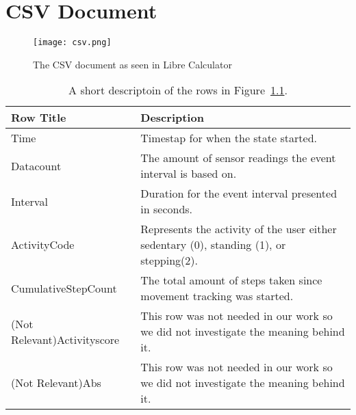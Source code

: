 \chapter{CSV Document}
\label{csvDocument}

\begin{figure}[h!]
	\centering
		\texttt{[image: csv.png]}
		\caption{\footnotesize The CSV document as seen in Libre Calculator}
		\label{fig:csvExtract}
\end{figure}

\begin{table}[h!]
  \begin{center}
  \begin{tabular}{|l|p{10cm}|}
    \hline
    \textbf{Row Title} & \textbf{Description} \\ \hline
    Time & Timestap for when the state started. \\ \hline
    Datacount & The amount of sensor readings the event interval is based on. \\ \hline
    Interval & Duration for the event interval presented in seconds. \\ \hline
    ActivityCode & Represents the activity of the user either sedentary (0), standing (1), or stepping(2). \\ \hline
    CumulativeStepCount & The total amount of steps taken since movement tracking was started. \\ \hline
    (Not Relevant)Activityscore & This row was not needed in our work so we did not investigate the meaning behind it. \\ \hline
   	(Not Relevant)Abs & This row was not needed in our work so we did not investigate the meaning behind it. \\ \hline
  \end{tabular}
  \end{center}
  \caption{A short descriptoin of the rows in Figure~\ref{fig:csvExtract}.}
  \label{tab:csvDescription}
\end{table}